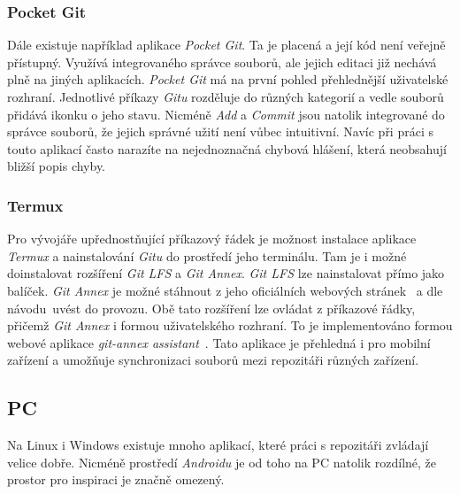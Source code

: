         \subsubsection{Pocket Git~}
        Dále existuje například aplikace \emph{Pocket Git}. Ta je placená a její kód není veřejně přístupný. Využívá integrovaného správce souborů, ale jejich editaci již nechává plně na jiných aplikacích. \emph{Pocket Git} má na první pohled přehlednější uživatelské rozhraní. Jednotlivé příkazy \emph{Gitu} rozděluje do různých kategorií a vedle souborů přidává ikonku o jeho stavu. Nicméně \emph{Add} a \emph{Commit} jsou natolik integrované do správce souborů, že jejich správné užití není vůbec intuitivní. Navíc při práci s touto aplikací často narazíte na nejednoznačná chybová hlášení, která neobsahují bližší popis chyby.

        \subsubsection{Termux~}
        Pro vývojáře upřednostňující příkazový řádek je možnost instalace aplikace \emph{Termux} a nainstalování \emph{Gitu} do prostředí jeho terminálu. Tam je i možné doinstalovat rozšíření \emph{Git LFS} a \emph{Git Annex}. \emph{Git LFS} lze nainstalovat přímo jako balíček. \emph{Git Annex} je možné stáhnout z jeho oficiálních webových stránek~ a dle návodu~uvést do provozu. Obě tato rozšíření lze ovládat z příkazové řádky, přičemž \emph{Git Annex} i formou uživatelského rozhraní. To je implementováno formou webové aplikace \emph{git-annex assistant}~. Tato aplikace je přehledná i pro mobilní zařízení a umožňuje synchronizaci souborů mezi repozitáři různých zařízení.

    \subsection {PC}
    Na Linux i Windows existuje mnoho aplikací, které práci s repozitáři zvládají velice dobře. Nicméně prostředí \emph{Androidu} je od toho na PC natolik rozdílné, že prostor pro inspiraci je značně omezený.
